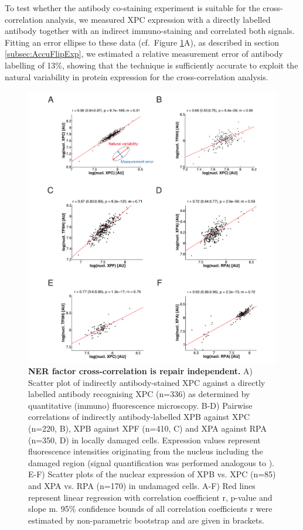 To test whether the antibody co-staining experiment is suitable for the cross-correlation analysis, we measured XPC expression with a directly labelled antibody together with an indirect immuno-staining and correlated both signals. Fitting an error ellipse to these data (cf.\ Figure \ref{fig:coExpressionData}A), as described in section  \ref{subsec:AccuFlipExp}, we estimated a relative measurement error of antibody labelling of 13\%, showing that the technique is sufficiently accurate to exploit the natural variability in protein expression for the cross-correlation analysis.
\begin{figure}[htbp]
	\begin{center}
		\includegraphics[width=1\textwidth]{Abbildungen/figureTAC_2.pdf}
		\caption{\textbf{NER factor cross-correlation is repair independent.} A) Scatter plot of indirectly antibody-stained XPC against a directly labelled antibody recognising XPC (n=336) as determined by quantitative (immuno) fluorescence microscopy. B-D) Pairwise correlations of indirectly antibody-labelled XPB against XPC (n=220, B), XPB against XPF (n=410, C) and XPA against RPA (n=350, D) in locally damaged cells. Expression values represent fluorescence intensities originating from the nucleus including the damaged region (signal quantification was performed analogous to \cite{Luijsterburg2010}). E-F) Scatter plots of the nuclear expression of XPB vs. XPC (n=85) and XPA vs. RPA (n=170) in undamaged cells. A-F) Red lines represent linear regression with correlation coefficient r, p-value and slope m. 95\% confidence bounds of all correlation coefficients r were estimated by non-parametric bootstrap and are given in brackets. }
		\label{fig:coExpressionData}
	\end{center}
\end{figure}

